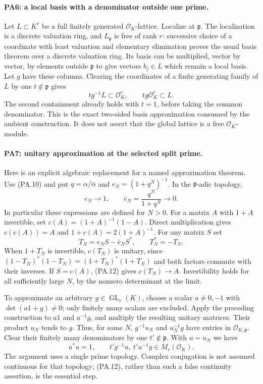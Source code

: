 \paragraph{PA6: a local basis with a denominator outside one prime.}
Let $L\subset K^r$ be a full finitely generated
$\mathcal O_K$-lattice. Localize at $\mathfrak p$. The localization
is a discrete valuation ring, and $L_{\mathfrak p}$ is free of
rank $r$: successive choice of a coordinate with least valuation
and elementary elimination proves the usual basis theorem over
a discrete valuation ring. Its basis can be multiplied, vector
by vector, by elements outside $\mathfrak p$ to give vectors
$b_j\in L$ which remain a local basis. Let $g$ have these columns.
Clearing the coordinates of a finite generating family of $L$
by one $t\notin\mathfrak p$ gives
\[
       t g^{-1}L\subset\mathcal O_K^r,
       \qquad t g\mathcal O_K^r\subset L.                      \tag{PA.11}
\]
The second containment already holds with $t=1$, before taking
the common denominator. This is the exact two-sided basis
approximation consumed by the ambient construction. It does not
assert that the global lattice is a free $\mathcal O_K$-module.

\paragraph{PA7: unitary approximation at the selected split prime.}
Here is an explicit algebraic replacement for a named approximation
theorem. Use (PA.10) and put $q=\alpha/\bar\alpha$ and
$e_N=(1+q^N)^{-1}$. In the $\mathfrak p$-adic topology,
\[
       e_N\longrightarrow1,\qquad
       \bar e_N=\frac{q^N}{1+q^N}\longrightarrow0.              \tag{PA.12}
\]
In particular these expressions are defined for $N>0$.
For a matrix $A$ with $1+A$ invertible, set
$c(A)=(1+A)^{-1}(1-A)$. Direct multiplication gives
$c(c(A))=A$ and $1+c(A)=2(1+A)^{-1}$.
For any matrix $S$ set
\[
      T_N=e_NS-\bar e_NS^*,\qquad T_N^*=-T_N.
                                                               \tag{PA.13}
\]
When $1+T_N$ is invertible, $c(T_N)$ is unitary, since
$(1-T_N)^*(1-T_N)=(1+T_N)^*(1+T_N)$ and both factors commute
with their inverses. If $S=c(A)$, (PA.12) gives
$c(T_N)\to A$. Invertibility holds for all sufficiently large
$N$, by the nonzero determinant at the limit.

To approximate an arbitrary $g\in\operatorname{GL}_r(K)$,
choose a scalar $a\ne0,-1$ with $\det(a1+g)\ne0$; only finitely
many scalars are excluded. Apply the preceding construction to
$a1$ and $a^{-1}g$, and multiply the resulting unitary matrices.
Their product $u_N$ tends to $g$. Thus, for some $N$,
$g^{-1}u_N$ and $u_N^{-1}g$ have entries in
$\mathcal O_{K,\mathfrak p}$. Clear their finitely many denominators
by one $t'\notin\mathfrak p$. With $u=u_N$ we have
\[
 u^*u=1,\qquad
 t'g^{-1}u,\ t'u^{-1}g\in M_r(\mathcal O_K).                   \tag{PA.14}
\]
The argument uses a single prime topology. Complex conjugation
is not assumed continuous for that topology; (PA.12), rather
than such a false continuity assertion, is the essential step.

